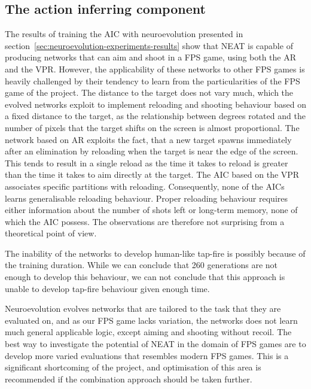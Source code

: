 \subsection{The action inferring component}
The results of training the AIC with neuroevolution presented in section~\ref{sec:neuroevolution-experiments-results} show that NEAT is capable of producing networks that can aim and shoot in a FPS game, using both the AR and the VPR. However, the applicability of these networks to other FPS games is heavily challenged by their tendency to learn from the particularities of the FPS game of the project. The distance to the target does not vary much, which the evolved networks exploit to implement reloading and shooting behaviour based on a fixed distance to the target, as the relationship between degrees rotated and the number of pixels that the target shifts on the screen is almost proportional. The network based on AR exploits the fact, that a new target spawns immediately after an elimination by reloading when the target is near the edge of the screen. This tends to result in a single reload as the time it takes to reload is greater than the time it takes to aim directly at the target. The AIC based on the VPR associates specific partitions with reloading. Consequently, none of the AICs learns generalisable reloading behaviour. Proper reloading behaviour requires either information about the number of shots left or long-term memory, none of which the AIC possess. The observations are therefore not surprising from a theoretical point of view.

The inability of the networks to develop human-like tap-fire is possibly because of the training duration. While we can conclude that 260 generations are not enough to develop this behaviour, we can not conclude that this approach is unable to develop tap-fire behaviour given enough time.

Neuroevolution evolves networks that are tailored to the task that they are evaluated on, and as our FPS game lacks variation, the networks does not learn much general applicable logic, except aiming and shooting without recoil. The best way to investigate the potential of NEAT in the domain of FPS games are to develop more varied evaluations that resembles modern FPS games. This is a significant shortcoming of the project, and optimisation of this area is recommended if the combination approach should be taken further.


